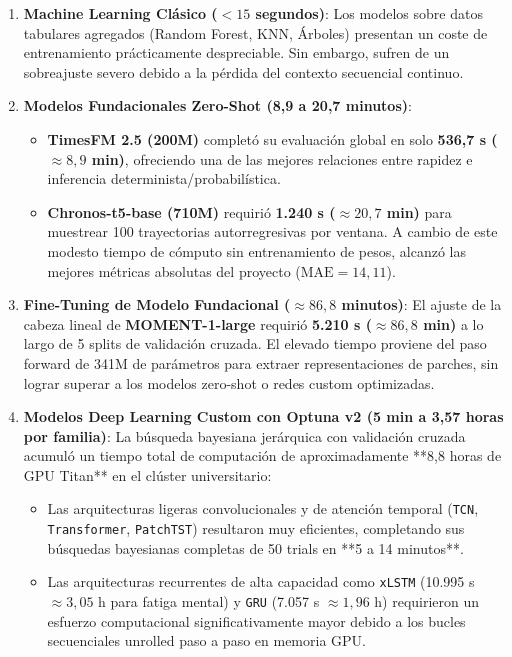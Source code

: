 \documentclass[12pt, a4paper]{article}
\newcommand{\code}[1]{\texttt{#1}}
\begin{document}
\begin{enumerate}
    \item \textbf{Machine Learning Clásico ($<15$ segundos)}: Los modelos sobre datos tabulares agregados (Random Forest, KNN, Árboles) presentan un coste de entrenamiento prácticamente despreciable. Sin embargo, sufren de un sobreajuste severo debido a la pérdida del contexto secuencial continuo.
    
    \item \textbf{Modelos Fundacionales Zero-Shot (8,9 a 20,7 minutos)}:
    \begin{itemize}
        \item \textbf{TimesFM 2.5 (200M)} completó su evaluación global en solo \textbf{536,7 s ($\approx 8,9$ min)}, ofreciendo una de las mejores relaciones entre rapidez e inferencia determinista/probabilística.
        \item \textbf{Chronos-t5-base (710M)} requirió \textbf{1.240 s ($\approx 20,7$ min)} para muestrear 100 trayectorias autorregresivas por ventana. A cambio de este modesto tiempo de cómputo sin entrenamiento de pesos, alcanzó las mejores métricas absolutas del proyecto ($\text{MAE} = 14,11$).
    \end{itemize}
    
    \item \textbf{Fine-Tuning de Modelo Fundacional ($\approx 86,8$ minutos)}:
    El ajuste de la cabeza lineal de \textbf{MOMENT-1-large} requirió \textbf{5.210 s ($\approx 86,8$ min)} a lo largo de 5 splits de validación cruzada. El elevado tiempo proviene del paso forward de 341M de parámetros para extraer representaciones de parches, sin lograr superar a los modelos zero-shot o redes custom optimizadas.
    
    \item \textbf{Modelos Deep Learning Custom con Optuna v2 (5 min a 3,57 horas por familia)}:
    La búsqueda bayesiana jerárquica con validación cruzada acumuló un tiempo total de computación de aproximadamente **8,8 horas de GPU Titan** en el clúster universitario:
    \begin{itemize}
        \item Las arquitecturas ligeras convolucionales y de atención temporal (\code{TCN}, \code{Transformer}, \code{PatchTST}) resultaron muy eficientes, completando sus búsquedas bayesianas completas de 50 trials en **5 a 14 minutos**.
        \item Las arquitecturas recurrentes de alta capacidad como \code{xLSTM} (10.995 s $\approx 3,05$ h para fatiga mental) y \code{GRU} (7.057 s $\approx 1,96$ h) requirieron un esfuerzo computacional significativamente mayor debido a los bucles secuenciales unrolled paso a paso en memoria GPU.
    \end{itemize}
\end{enumerate}
\end{document}
